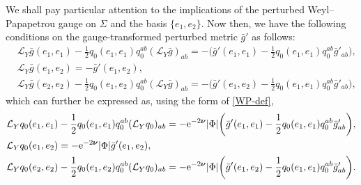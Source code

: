 \documentclass[11pt]{article}
\numberwithin{equation}{section}
\def\mbo#1{\boldsymbol{#1}}%
\def\halb{\frac{1}{2}}%
\numberwithin{equation}{section}
\begin{document}
We shall pay particular attention to the implications of the perturbed Weyl--Papapetrou gauge on $\Sigma$ and the basis $\{ e_1, e_2\}$. Now then, we have the following conditions on the gauge-transformed perturbed metric $\bar{g}'$ as follows:
\begin{align*}
&\mathcal{L}_Y \bar{g} (e_1, e_1) -\halb q_{0} (e_1, e_1) q^{ab}_0 (\mathcal{L}_{Y} \bar{g} ) _{ab}= - \biggl(\bar{g}' (e_1, e_1) - \halb q_0 (e_1, e_1) q^{ab}_0 \bar{g}'_{ab} \biggr) , \\
&\mathcal{L}_Y \bar{g} (e_1, e_2)= - \bar{g}' (e_1, e_2) , \\
&\mathcal{L}_Y \bar{g} (e_2, e_2) -\halb q_{0} (e_1, e_2) q^{ab}_0 (\mathcal{L}_{Y} \bar{g} ) _{ab}= - \biggl(\bar{g}' (e_1, e_2) - \halb q_0 (e_1, e_1) q^{ab}_0 \bar{g}'_{ab} \biggr),
\end{align*}
which can further be expressed as, using the form of \eqref{WP-def},
\begin{align*}
&\mathcal{L}_Y q_0 (e_1, e_1) -\halb q_{0} (e_1, e_1) q^{ab}_0 (\mathcal{L}_{Y} q_0 ) _{ab}= - {\rm e}^{-2 \mbo{\nu}}\vert \Phi \vert \biggl(\bar{g}' (e_1, e_1) - \halb q_0 (e_1, e_1) q^{ab}_0 \bar{g}'_{ab} \biggr) , \\
&\mathcal{L}_Y q_0 (e_1, e_2)= -{\rm e}^{-2\mbo{\nu}} \vert \Phi \vert \bar{g}' (e_1, e_2) , \\
&\mathcal{L}_Y q_0 (e_2, e_2) -\halb q_{0} (e_1, e_2) q^{ab}_0 (\mathcal{L}_{Y} q_0 ) _{ab}= - {\rm e}^{-2\mbo{\nu}}\vert \Phi \vert \biggl(\bar{g}' (e_1, e_2) - \halb q_0 (e_1, e_1) q^{ab}_0 \bar{g}'_{ab} \biggr).
\end{align*}
\end{document}
